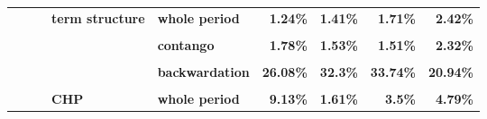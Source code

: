 \documentclass[
  authoryear,
  preprint,
  3p]{elsarticle}
\begin{document}
\begin{landscape}
\begin{longtable}[t]{>{}l>{}l>{}l>{}l>{}l>{}r>{}r>{}r>{}r}
\textbf{} & \textbf{} & \textbf{} & \textbf{term structure} & \textbf{whole period} & \textcolor[HTML]{4285f4}{\textbf{1.24\%}} & \textcolor[HTML]{4285f4}{\textbf{1.41\%}} & \textcolor[HTML]{4285f4}{\textbf{1.71\%}} & \textcolor[HTML]{4285f4}{\textbf{2.42\%}}\\
\addlinespace
\textbf{\cellcolor{gray!10}{}} & \textbf{\cellcolor{gray!10}{}} & \textbf{\cellcolor{gray!10}{}} & \textbf{\cellcolor{gray!10}{}} & \textbf{\cellcolor{gray!10}{backwardation}} & \textcolor[HTML]{4285f4}{\textbf{\cellcolor{gray!10}{1.25\%}}} & \textcolor[HTML]{4285f4}{\textbf{\cellcolor{gray!10}{1.44\%}}} & \textcolor[HTML]{4285f4}{\textbf{\cellcolor{gray!10}{2.25\%}}} & \textcolor[HTML]{4285f4}{\textbf{\cellcolor{gray!10}{3.08\%}}}\\
\textbf{} & \textbf{} & \textbf{} & \textbf{} & \textbf{contango} & \textcolor[HTML]{4285f4}{\textbf{1.78\%}} & \textcolor[HTML]{4285f4}{\textbf{1.53\%}} & \textcolor[HTML]{4285f4}{\textbf{1.51\%}} & \textcolor[HTML]{4285f4}{\textbf{2.32\%}}\\
\textbf{\cellcolor{gray!10}{}} & \textbf{\cellcolor{gray!10}{energy}} & \textbf{\cellcolor{gray!10}{all}} & \textbf{\cellcolor{gray!10}{market}} & \textbf{\cellcolor{gray!10}{whole period}} & \textcolor[HTML]{4285f4}{\textbf{\cellcolor{gray!10}{26.58\%}}} & \textcolor[HTML]{4285f4}{\textbf{\cellcolor{gray!10}{31.57\%}}} & \textcolor[HTML]{4285f4}{\textbf{\cellcolor{gray!10}{38.94\%}}} & \textcolor[HTML]{4285f4}{\textbf{\cellcolor{gray!10}{25.9\%}}}\\
\textbf{} & \textbf{} & \textbf{} & \textbf{} & \textbf{backwardation} & \textcolor[HTML]{4285f4}{\textbf{26.08\%}} & \textcolor[HTML]{4285f4}{\textbf{32.3\%}} & \textcolor[HTML]{4285f4}{\textbf{33.74\%}} & \textcolor[HTML]{4285f4}{\textbf{20.94\%}}\\
\textbf{\cellcolor{gray!10}{}} & \textbf{\cellcolor{gray!10}{}} & \textbf{\cellcolor{gray!10}{}} & \textbf{\cellcolor{gray!10}{}} & \textbf{\cellcolor{gray!10}{contango}} & \textcolor[HTML]{4285f4}{\textbf{\cellcolor{gray!10}{26.84\%}}} & \textcolor[HTML]{4285f4}{\textbf{\cellcolor{gray!10}{31.47\%}}} & \textcolor[HTML]{4285f4}{\textbf{\cellcolor{gray!10}{42.16\%}}} & \textcolor[HTML]{4285f4}{\textbf{\cellcolor{gray!10}{28.77\%}}}\\
\addlinespace
\textbf{} & \textbf{} & \textbf{} & \textbf{CHP} & \textbf{whole period} & \textcolor[HTML]{4285f4}{\textbf{9.13\%}} & \textcolor[HTML]{4285f4}{\textbf{1.61\%}} & \textcolor[HTML]{4285f4}{\textbf{3.5\%}} & \textcolor[HTML]{4285f4}{\textbf{4.79\%}}\\

\end{longtable}
\end{landscape}
\end{document}
